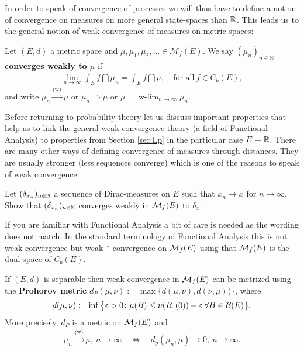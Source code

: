 In order to speak of convergence of processes we will thus have to define a notion of convergence on measures on more general state-spaces than $\mathbb{R}$. This leads us to the general notion of weak convergence of measures on metric spaces:
\begin{ldef}
\begin{deff}
	Let $(E,d)$ a metric space and $\mu,\mu_1,\mu_2,...\in \mathcal M_f(E)$. We say \textbf{$(\mu_n)_{n\in\mathbb{N}}$ converges weakly to $\mu$} if
	\begin{align*}
		\lim_{n\to\infty} \int_E f\dint \mu_n = \int_E f \dint \mu, \quad \text{for all}\: f \in C_b(E),
	\end{align*}
	and write $\mu_n \overset{\text{(w)}}{\longrightarrow}\mu$ or $\mu_n\Rightarrow \mu$ or $\mu = \operatorname{w-\lim\limits}_{n\to\infty}\mu_n$.
\end{deff}
\end{ldef}
Before returning to probability theory let us discuss important properties that help us to link the general weak convergence theory (a field of Functional Analysis) to properties from Section \ref{sec:Lp} in the particular case $E=\mathbb{R}$. 	There are many other ways of defining convergence of measures through distances. They are usually stronger (less sequences converge) which is one of the reasons to speak of weak convergence.
\begin{luebung}
	Let $(\delta_{x_n})_{n\in\mathbb{N}}$ a sequence of Dirac-measures on $E$ such that $x_n\to x$ for $n\to\infty$. Show that $(\delta_{x_n})_{n\in\mathbb{N}}$ converges weakly in $\mathcal{M}_f(E)$ to $\delta_x$.
\end{luebung}
If you are familiar with Functional Analysis a bit of care is needed as the wording does not match. In the standard terminology of Functional Analysis this is not weak convergence but weak-$*$-convergence on $\mathcal{M}_f(E)$ using that $\mathcal{M}_f(E)$ is the dual-space of $C_b(E)$.
\begin{laussagewerkzeug}
	\begin{prop}
			If $(E,d)$ is separable then weak convergence in $\mathcal{M}_f(E)$ can be metrized using the \textbf{Prohorov metric} $d_{P}(\mu,\nu):=\max\{d(\mu,\nu),d(\nu,\mu))\}$, where
			\begin{align*}
				d(\mu,\nu) \coloneqq \inf \big\{ \varepsilon >0 \colon \mu (B) \leq \nu (B_{\varepsilon}(0)) + \varepsilon \:\forall B\in \mathcal{B}(E) \big\}.
			\end{align*}
			More precisely, $d_P$ is a metric on $\mathcal{M}_f(E)$ and
			\begin{align*}
				\mu_n \overset{\text{(w)}}{\longrightarrow}\mu, \: n \to \infty \quad\Leftrightarrow \quad d_p(\mu_n,\mu) \to 0, \: n\to \infty.
			\end{align*}
\end{prop}
\end{laussagewerkzeug}
